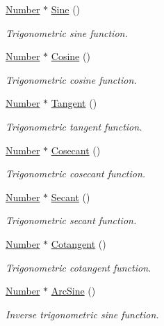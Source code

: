 \begin{DoxyCompactItemize}
\hyperlink{structNumber}{Number} $\ast$ \hyperlink{structRealNumber_a7efbe5a6d43471c317d10c976e1120a5}{Sine} ()
\begin{DoxyCompactList}\small\item\em Trigonometric sine function. \end{DoxyCompactList}\item 
\hyperlink{structNumber}{Number} $\ast$ \hyperlink{structRealNumber_a29ab57ef9d5844b480574f06b83131d1}{Cosine} ()
\begin{DoxyCompactList}\small\item\em Trigonometric cosine function. \end{DoxyCompactList}\item 
\hyperlink{structNumber}{Number} $\ast$ \hyperlink{structRealNumber_a49a5b0cd18ee9763f89f2bc61f7d43ba}{Tangent} ()
\begin{DoxyCompactList}\small\item\em Trigonometric tangent function. \end{DoxyCompactList}\item 
\hyperlink{structNumber}{Number} $\ast$ \hyperlink{structRealNumber_af9b0b74fbe21e7c360d9ca13f2853c3c}{Cosecant} ()
\begin{DoxyCompactList}\small\item\em Trigonometric cosecant function. \end{DoxyCompactList}\item 
\hyperlink{structNumber}{Number} $\ast$ \hyperlink{structRealNumber_a9e350ff4550f86bc25b6526eb14a823a}{Secant} ()
\begin{DoxyCompactList}\small\item\em Trigonometric secant function. \end{DoxyCompactList}\item 
\hyperlink{structNumber}{Number} $\ast$ \hyperlink{structRealNumber_a326c66036f26f4562277692d179e19a3}{Cotangent} ()
\begin{DoxyCompactList}\small\item\em Trigonometric cotangent function. \end{DoxyCompactList}\item 
\hyperlink{structNumber}{Number} $\ast$ \hyperlink{structRealNumber_aff1b5b8d942f4e160dc0720e67c3765a}{Arc\+Sine} ()
\begin{DoxyCompactList}\small\item\em Inverse trigonometric sine function. \end{DoxyCompactList}\item 

\end{DoxyCompactItemize}
